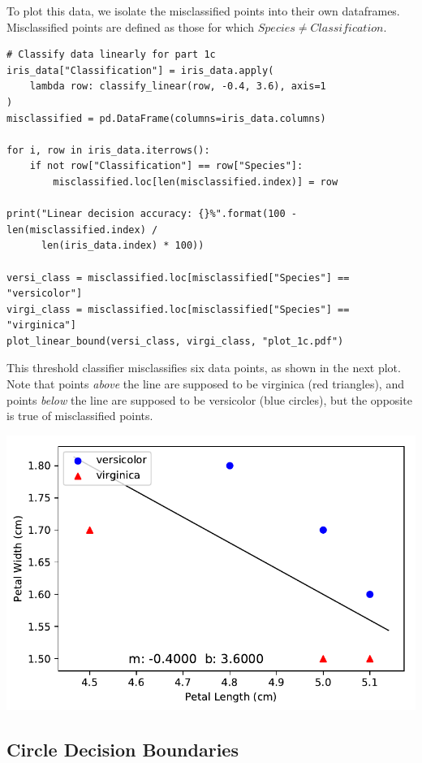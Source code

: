 \documentclass[letterpaper]{article}
\begin{document}
To plot this data, we isolate the misclassified points into their own dataframes.
Misclassified points are defined as those for which $Species \neq Classification$.
\begin{verbatim}
# Classify data linearly for part 1c
iris_data["Classification"] = iris_data.apply(
    lambda row: classify_linear(row, -0.4, 3.6), axis=1
)
misclassified = pd.DataFrame(columns=iris_data.columns)

for i, row in iris_data.iterrows():
    if not row["Classification"] == row["Species"]:
        misclassified.loc[len(misclassified.index)] = row

print("Linear decision accuracy: {}%".format(100 - len(misclassified.index) /
      len(iris_data.index) * 100))

versi_class = misclassified.loc[misclassified["Species"] == "versicolor"]
virgi_class = misclassified.loc[misclassified["Species"] == "virginica"]
plot_linear_bound(versi_class, virgi_class, "plot_1c.pdf")
\end{verbatim}
This threshold classifier misclassifies six data points, as shown in the next
plot. Note that points \textit{above} the line are supposed to be virginica
(red triangles), and points \textit{below} the line are supposed to be
versicolor (blue circles), but the opposite is true of misclassified points.
\begin{center}
\includegraphics{plot_1c.pdf}
\end{center}

\subsection{Circle Decision Boundaries}
\end{document}
